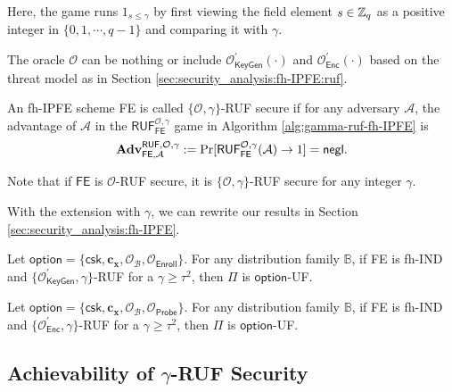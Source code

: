 Here, the game runs $1_{s \leq \gamma}$ by first viewing the field element $s \in \mathbb{Z}_q$ as a positive integer in $\{0, 1, \cdots, q-1 \}$ and comparing it with $\gamma$.

The oracle $\mathcal{O}$ can be nothing or include $\mathcal{O}^\prime_{\textsf{KeyGen}}(\cdot)$ and $\mathcal{O}^\prime_{\textsf{Enc}}(\cdot)$ based on the threat model as in Section \ref{sec:security_analysis:fh-IPFE:ruf}.

\begin{definition}

	An fh-IPFE scheme \textsf{FE} is called $\{ \mathcal{O}, \gamma \}$-RUF secure if for any adversary $\mathcal{A}$, the advantage of $\mathcal{A}$ in the $\textsf{RUF}^{\mathcal{O}, \gamma}_\textsf{FE}$ game in Algorithm \ref{alg:gamma-ruf-fh-IPFE} is
\[
	\mathbf{Adv}_{\textsf{FE}, \mathcal{A}}^{\textsf{RUF}, \mathcal{O}, \gamma} := \Pr[\textsf{RUF}^{\mathcal{O}, \gamma}_{\textsf{FE}}(\mathcal{A}) \to 1 ] = \mathsf{negl}.
\]

\noindent Note that if $\textsf{FE}$ is $\mathcal{O}$-RUF secure, it is $\{ \mathcal{O}, \gamma \}$-RUF secure for any integer $\gamma$.
\end{definition}

With the extension with $\gamma$, we can rewrite our results in Section \ref{sec:security_analysis:fh-IPFE}.


\begin{theorem}
\label{thm:fh-IPFE:ind-gamma-ruf-OB-Enroll}
	Let $\textsf{option} = \{ \textsf{csk}, \mathbf{c_x}, \mathcal{O}_\mathcal{B}, \mathcal{O}_{\textsf{Enroll}} \}$. For any distribution family $\mathbb{B}$, if \textsf{FE} is fh-IND and $\{ \mathcal{O}^\prime_{\textsf{KeyGen}}, \gamma \}$-RUF for a $\gamma \geq \tau^2$, then $\Pi$ is $\textsf{option}$-UF. 
\end{theorem}

\begin{theorem}
\label{thm:fh-IPFE:ind-gamma-ruf-OB-Probe}
	Let $\textsf{option} = \{\textsf{csk}, \mathbf{c_x}, \mathcal{O}_\mathcal{B}, \mathcal{O}_\textsf{Probe}\}$. For any distribution family $\mathbb{B}$, if \textsf{FE} is fh-IND and $\{ \mathcal{O}^\prime_{\textsf{Enc}}, \gamma \}$-RUF for a $\gamma \geq \tau^2$, then $\Pi$ is $\textsf{option}$-UF. 
\end{theorem}

\subsection{Achievability of $\gamma$-RUF Security}

